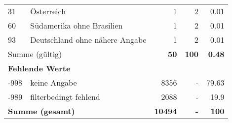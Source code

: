 \begin{longtable}{lXrrr}
     31 &
     \multicolumn{1}{X}{ Österreich   } &


       \num{1} &
       \num[round-mode=places,round-precision=2]{2} &
         \num[round-mode=places,round-precision=2]{0,01} \\

     60 &
     \multicolumn{1}{X}{ Südamerika ohne Brasilien   } &


       \num{1} &
       \num[round-mode=places,round-precision=2]{2} &
         \num[round-mode=places,round-precision=2]{0,01} \\

     93 &
     \multicolumn{1}{X}{ Deutschland ohne nähere Angabe   } &


       \num{1} &
       \num[round-mode=places,round-precision=2]{2} &
         \num[round-mode=places,round-precision=2]{0,01} \\
     \midrule
     \multicolumn{2}{l}{Summe (gültig)} &
       \textbf{\num{50}} &
     \textbf{100} &
       \textbf{\num[round-mode=places,round-precision=2]{0,48}} \\
     \multicolumn{5}{l}{\textbf{Fehlende Werte}}\\
       -998 &
       keine Angabe &
         \num{8356} &
        - &
         \num[round-mode=places,round-precision=2]{79,63} \\
       -989 &
       filterbedingt fehlend &
         \num{2088} &
        - &
         \num[round-mode=places,round-precision=2]{19,9} \\
     \midrule
     \multicolumn{2}{l}{\textbf{Summe (gesamt)}} &
          \textbf{\num{10494}} &
        \textbf{-} &
        \textbf{100} \\
     \bottomrule
     \end{longtable}
     
